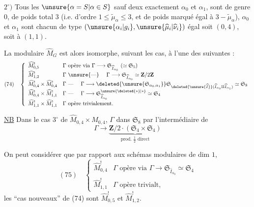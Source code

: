 $2^\circ)$ Tous les $\unsure{\alpha=S|\alpha\in S}$ sauf deux exactement $\alpha_0$ et $\alpha_1$, sont de genre $0$,  de poids total $3$ (i.e. d'ordre $1\leq\widetilde\mu_\alpha\leq3$, et de poids marqué égal à $3-\widetilde\mu_\alpha$), $\alpha_0$ et $\alpha_1$ sont chacun  de type $(\unsure{\alpha_i|g_i},\unsure{\widehat\mu_i|\widehat\nu_i})$ égal soit $(0,4)$, soit à $(1,1)$.

La   modulaire $\widehat M_G$ est alors isomorphe, suivant les cas, à l'une des suivantes :
\[
(74)\quad\left\{\begin{array}{ll}
\widehat M^!_{0,5}&\Gamma\text{ opère via }\Gamma\longrightarrow\mathfrak S_{\widehat I_{\alpha_0}}\ (\simeq\mathfrak S_5)\\
\widehat M^!_{1,2}&\Gamma\text{ \unsure{---} }\quad\Gamma\longrightarrow\mathfrak S_{\widehat I_{\alpha_0}}\simeq\mathbf Z/2\mathbf Z\\
\widehat M^!_{0,4}\times\widehat M^!_{0,4}&\Gamma\text{ --- }\quad\Gamma\longrightarrow\deleted{\unsure{\mathfrak S_{\alpha_0,\alpha_1}}}\mathfrak S_{\deleted{\unsure{\widehat I}}(\widehat I_{\alpha_0}\amalg\widehat I_{\alpha_1})}\simeq\mathfrak S_8\\
\widehat M^!_{0,4}\times\widehat M^!_{1,1}&\Gamma\text{ --- }\quad\Gamma\longrightarrow\mathfrak S^{\unsure{\deleted{*}|*}}_{\widehat I_{\alpha_0}}\simeq\mathfrak S_4\\
\widehat M^!_{1,1}\times\widehat M^!_{1,1}&\Gamma\text{ opère trivialement.}
\end{array}\right.
\]

\uline{NB}  Dans le cas $3^\circ$ de $\widehat M_{0,4}\times\widehat M_{0,4}$, $\Gamma$  dans $\mathfrak S_8$ par l'intermédiaire de
\[
\Gamma\longrightarrow\underbrace{\mathbf Z/2\mathbin{\cdot}(\mathfrak S_4\times\mathfrak S_4)}_{\text{prod. }\frac12\text{ direct}}
\]

On peut considérer que par rapport aux schémas modulaires  de dim $1$, 
\[
(75)\quad\left\{\begin{array}{ll}
\widehat M^!_{0,4}&\Gamma\text{ opère via }\Gamma\longrightarrow\mathfrak S_{\widehat I_{\alpha_0}}\simeq\mathfrak S_4\\
\widehat M^!_{1,1}&\Gamma\text{ opère trivialt},
\end{array}\right.
\]
les ``cas nouveaux'' de (74) sont $\widehat M^!_{0,5}$ et $\widehat M^!_{1,2}$.

